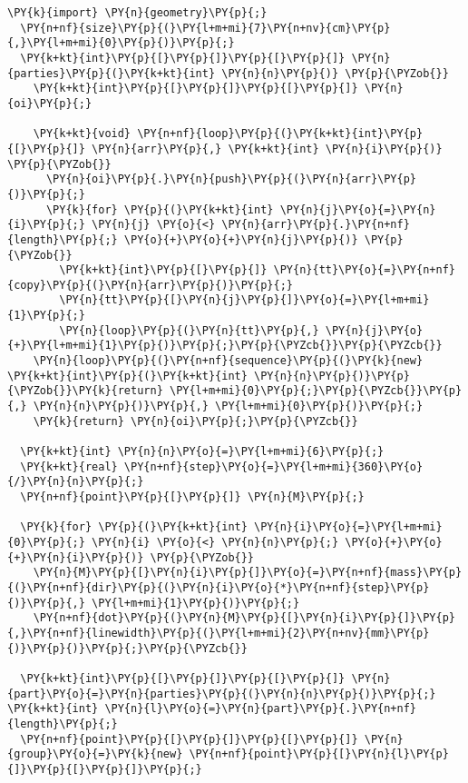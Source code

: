 \begin{Verbatim}[commandchars=\\\{\}]
  \PY{k}{import} \PY{n}{geometry}\PY{p}{;}
  \PY{n+nf}{size}\PY{p}{(}\PY{l+m+mi}{7}\PY{n+nv}{cm}\PY{p}{,}\PY{l+m+mi}{0}\PY{p}{)}\PY{p}{;}
  \PY{k+kt}{int}\PY{p}{[}\PY{p}{]}\PY{p}{[}\PY{p}{]} \PY{n}{parties}\PY{p}{(}\PY{k+kt}{int} \PY{n}{n}\PY{p}{)} \PY{p}{\PYZob{}}
    \PY{k+kt}{int}\PY{p}{[}\PY{p}{]}\PY{p}{[}\PY{p}{]} \PY{n}{oi}\PY{p}{;}

    \PY{k+kt}{void} \PY{n+nf}{loop}\PY{p}{(}\PY{k+kt}{int}\PY{p}{[}\PY{p}{]} \PY{n}{arr}\PY{p}{,} \PY{k+kt}{int} \PY{n}{i}\PY{p}{)} \PY{p}{\PYZob{}}
      \PY{n}{oi}\PY{p}{.}\PY{n}{push}\PY{p}{(}\PY{n}{arr}\PY{p}{)}\PY{p}{;}
      \PY{k}{for} \PY{p}{(}\PY{k+kt}{int} \PY{n}{j}\PY{o}{=}\PY{n}{i}\PY{p}{;} \PY{n}{j} \PY{o}{<} \PY{n}{arr}\PY{p}{.}\PY{n+nf}{length}\PY{p}{;} \PY{o}{+}\PY{o}{+}\PY{n}{j}\PY{p}{)} \PY{p}{\PYZob{}}
        \PY{k+kt}{int}\PY{p}{[}\PY{p}{]} \PY{n}{tt}\PY{o}{=}\PY{n+nf}{copy}\PY{p}{(}\PY{n}{arr}\PY{p}{)}\PY{p}{;}
        \PY{n}{tt}\PY{p}{[}\PY{n}{j}\PY{p}{]}\PY{o}{=}\PY{l+m+mi}{1}\PY{p}{;}
        \PY{n}{loop}\PY{p}{(}\PY{n}{tt}\PY{p}{,} \PY{n}{j}\PY{o}{+}\PY{l+m+mi}{1}\PY{p}{)}\PY{p}{;}\PY{p}{\PYZcb{}}\PY{p}{\PYZcb{}}
    \PY{n}{loop}\PY{p}{(}\PY{n+nf}{sequence}\PY{p}{(}\PY{k}{new} \PY{k+kt}{int}\PY{p}{(}\PY{k+kt}{int} \PY{n}{n}\PY{p}{)}\PY{p}{\PYZob{}}\PY{k}{return} \PY{l+m+mi}{0}\PY{p}{;}\PY{p}{\PYZcb{}}\PY{p}{,} \PY{n}{n}\PY{p}{)}\PY{p}{,} \PY{l+m+mi}{0}\PY{p}{)}\PY{p}{;}
    \PY{k}{return} \PY{n}{oi}\PY{p}{;}\PY{p}{\PYZcb{}}

  \PY{k+kt}{int} \PY{n}{n}\PY{o}{=}\PY{l+m+mi}{6}\PY{p}{;}
  \PY{k+kt}{real} \PY{n+nf}{step}\PY{o}{=}\PY{l+m+mi}{360}\PY{o}{/}\PY{n}{n}\PY{p}{;}
  \PY{n+nf}{point}\PY{p}{[}\PY{p}{]} \PY{n}{M}\PY{p}{;}

  \PY{k}{for} \PY{p}{(}\PY{k+kt}{int} \PY{n}{i}\PY{o}{=}\PY{l+m+mi}{0}\PY{p}{;} \PY{n}{i} \PY{o}{<} \PY{n}{n}\PY{p}{;} \PY{o}{+}\PY{o}{+}\PY{n}{i}\PY{p}{)} \PY{p}{\PYZob{}}
    \PY{n}{M}\PY{p}{[}\PY{n}{i}\PY{p}{]}\PY{o}{=}\PY{n+nf}{mass}\PY{p}{(}\PY{n+nf}{dir}\PY{p}{(}\PY{n}{i}\PY{o}{*}\PY{n+nf}{step}\PY{p}{)}\PY{p}{,} \PY{l+m+mi}{1}\PY{p}{)}\PY{p}{;}
    \PY{n+nf}{dot}\PY{p}{(}\PY{n}{M}\PY{p}{[}\PY{n}{i}\PY{p}{]}\PY{p}{,}\PY{n+nf}{linewidth}\PY{p}{(}\PY{l+m+mi}{2}\PY{n+nv}{mm}\PY{p}{)}\PY{p}{)}\PY{p}{;}\PY{p}{\PYZcb{}}

  \PY{k+kt}{int}\PY{p}{[}\PY{p}{]}\PY{p}{[}\PY{p}{]} \PY{n}{part}\PY{o}{=}\PY{n}{parties}\PY{p}{(}\PY{n}{n}\PY{p}{)}\PY{p}{;} \PY{k+kt}{int} \PY{n}{l}\PY{o}{=}\PY{n}{part}\PY{p}{.}\PY{n+nf}{length}\PY{p}{;}
  \PY{n+nf}{point}\PY{p}{[}\PY{p}{]}\PY{p}{[}\PY{p}{]} \PY{n}{group}\PY{o}{=}\PY{k}{new} \PY{n+nf}{point}\PY{p}{[}\PY{n}{l}\PY{p}{]}\PY{p}{[}\PY{p}{]}\PY{p}{;}


\end{Verbatim}
